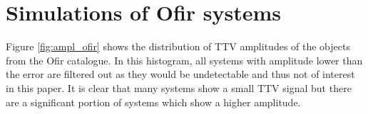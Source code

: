 \documentclass[12pt]{report}
\begin{document}
\section{Simulations of Ofir systems}
	Figure \ref{fig:ampl_ofir} shows the distribution of TTV amplitudes of the objects from the Ofir catalogue. In this histogram, all systems with amplitude lower than the error are filtered out as they would be undetectable and thus not of interest in this paper. It is clear that many systems show a small TTV signal but there are a significant portion of systems which show a higher amplitude. 

\end{document}
